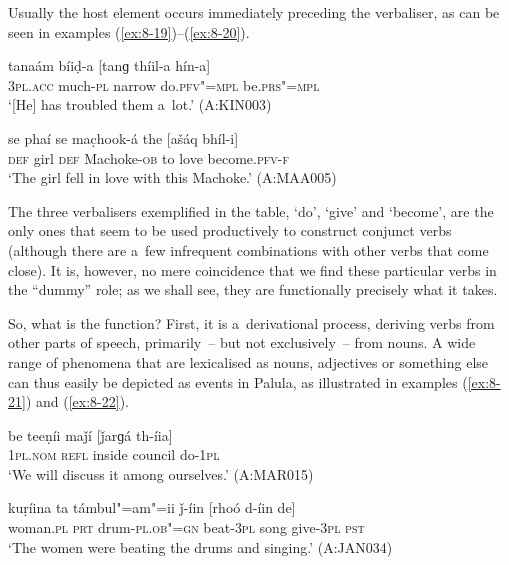 Usually the host element occurs immediately preceding the verbaliser, as can be seen in examples (\ref{ex:8-19})--(\ref{ex:8-20}).

\begin{exe}
\ex
\label{ex:8-19}
\gll tanaám bíiḍ-a [tanɡ thíil-a hín-a] \\
\textsc{3pl.acc} much-\textsc{pl} narrow do.\textsc{pfv"=mpl} be.\textsc{prs"=mpl} \\
\glt `[He] has troubled them a~lot.' (A:KIN003)
\end{exe}
\begin{exe}
\ex
\label{ex:8-20}
\gll se phaí se mac̣hook-á the [ašáq bhíl-i] \\
\textsc{def} girl \textsc{def} Machoke-\textsc{ob} to  love become.\textsc{pfv-f} \\
\glt `The girl fell in love with this Machoke.' (A:MAA005)
\end{exe}

The three verbalisers exemplified in the table, `do', `give' and `become', are the only ones that seem to be used productively to construct conjunct verbs (although there are a~few infrequent combinations with other verbs that come close). It is, however, no mere coincidence that we find these particular verbs in the ``dummy'' role; as we shall see, they are functionally precisely what it takes. 


So, what is the function? First, it is a~derivational process, deriving verbs from other parts of speech, primarily~-- but not exclusively~-- from nouns. A wide range of phenomena that are lexicalised as nouns, adjectives or something else can thus easily be depicted as events in Palula, as illustrated in examples (\ref{ex:8-21}) and (\ref{ex:8-22}). 

\begin{exe}
\ex
\label{ex:8-21}
\gll be teeṇíi maǰí [ǰarɡá th-íia] \\
\textsc{1}\textsc{pl.nom} \textsc{refl} inside council do-\textsc{1pl} \\
\glt `We will discuss it among ourselves.' (A:MAR015)
\end{exe}
\begin{exe}
\ex
\label{ex:8-22}
\gll kuṛíina ta támbul"=am"=ii ǰ-íin [rhoó d-íin de] \\
woman.\textsc{pl} \textsc{prt} drum-\textsc{pl.ob"=gn} beat-\textsc{3pl} song give-\textsc{3pl}
\textsc{pst} \\
\glt `The women were beating the drums and singing.' (A:JAN034)
\end{exe}


